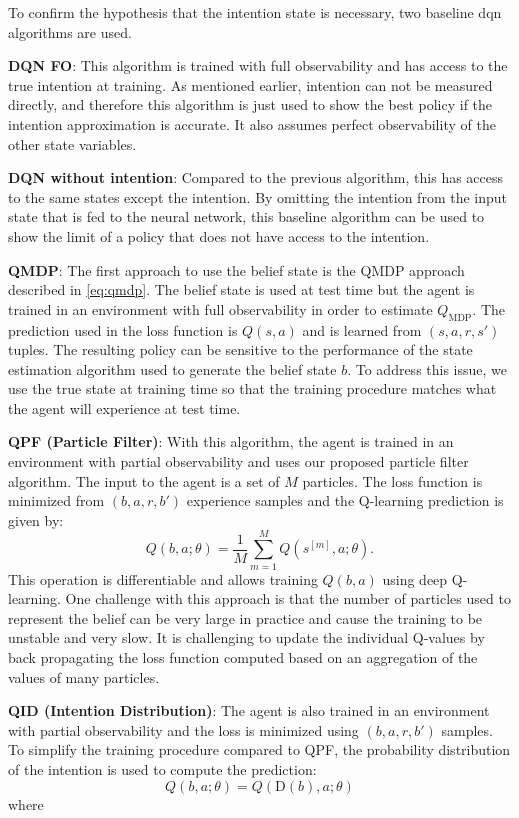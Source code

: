 To confirm the hypothesis that the intention state is necessary, two baseline \gls{dqn} algorithms are used. 

\textbf{DQN FO}: This algorithm is trained with full observability and has access to the true intention at training. As mentioned earlier, intention can not be measured directly, and therefore this algorithm is just used to show the best policy if the intention approximation is accurate. It also assumes perfect observability of the other state variables.

\textbf{DQN without intention}: Compared to the previous algorithm, this has access to the same states except the intention. By omitting the intention from the input state that is fed to the neural network, this baseline algorithm can be used to show the limit of a policy that does not have access to the intention.

\textbf{QMDP}: The first approach to use the belief state is the QMDP approach described in \ref{eq:qmdp}. 
The belief state is used at test time but the agent is trained in an environment with full observability in order to estimate $Q_{\text{MDP}}$. The prediction used in the loss function is $Q(s, a)$ and is learned from $(s, a, r, s')$ tuples.
The resulting policy can be sensitive to the performance of the state estimation algorithm used to generate the belief state $b$. 
To address this issue, we use the true state at training time so that the training procedure matches what the agent will experience at test time. 

\textbf{QPF (Particle Filter)}: With this algorithm, the agent is trained in an environment with partial observability and uses our proposed particle filter algorithm. 
The input to the agent is a set of $M$ particles. 
The loss function is minimized from $(b, a, r, b')$ experience samples and the Q-learning prediction is given by:
\begin{equation}
    Q(b, a; \theta) = \frac{1}{M} \sum_{m=1}^M Q(s^{[m]}, a; \theta).
\end{equation}
This operation is differentiable and allows training $Q(b, a)$ using deep Q-learning. 
One challenge with this approach is that the number of particles used to represent the belief can be very large in practice and cause the training to be unstable and very slow. It is challenging to update the individual Q-values by back propagating the loss function computed based on an aggregation of the values of many particles.

\textbf{QID (Intention Distribution)}: The agent is also trained in an environment with partial observability and the loss is minimized using $(b, a, r, b')$ samples. To simplify the training procedure compared to QPF, the probability distribution of the intention is used to compute the prediction:
\begin{equation}
    Q(b, a; \theta) = Q(\text{D}(b), a; \theta)
\end{equation}
where 

